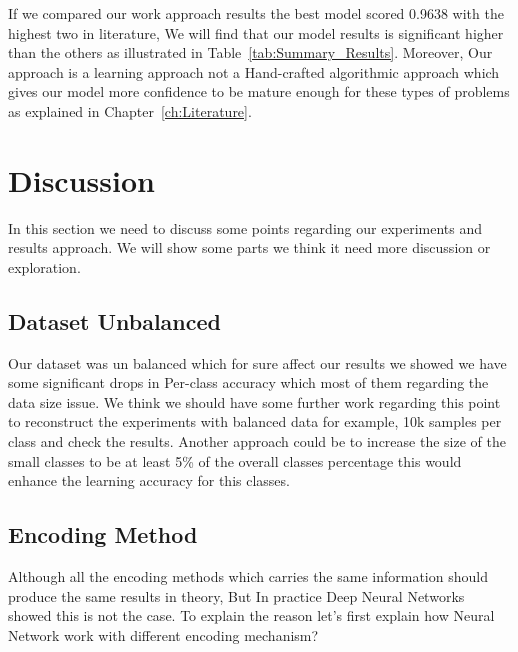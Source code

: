If we compared our work approach results the best model scored 0.9638 with the highest two in literature, We will find that our model results is significant higher than the others as illustrated in Table~\ref{tab:Summary_Results}. Moreover, Our approach is a learning approach not a Hand-crafted algorithmic approach which gives our model more confidence to be mature enough for these types of problems as explained in Chapter~\ref{ch:Literature}.

\section{Discussion}\label{sec:Discussion}

In this section we need to discuss some points regarding our experiments and results approach. We will show some parts we think it need more discussion or exploration.


\subsection{Dataset Unbalanced}

Our dataset was un balanced which for sure affect our results we showed we have some significant drops in Per-class accuracy which most of them regarding the data size issue. We think we should have some further work regarding this point to reconstruct the experiments with balanced data for example, 10k samples per class and check the results. Another approach could be to increase the size of the small classes to be at least 5\% of the overall classes percentage this would enhance the learning accuracy for this classes.
  
\subsection{Encoding Method}

Although all the encoding methods which carries the same information should produce the same results in theory, But In practice Deep Neural Networks showed this is not the case. To explain the reason let's first explain how Neural Network work with different encoding mechanism?

